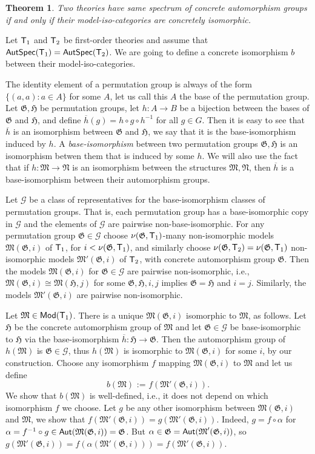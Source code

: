 \documentclass[12pt,leqno]{article}
\newcommand{\de}{\mbox{\ :=\ }}
\newcommand{\Mm}{\mbox{$\mathfrak M$}}
\newcommand{\Nn}{\mbox{$\mathfrak N$}}
\newcommand{\Gg}{\mbox{$\mathfrak G$}}
\newcommand{\Hh}{\mbox{$\mathfrak H$}}
\newcommand{\Aut}{\mbox{\sf Aut}}
\newcommand{\AutSpec}{\mbox{\sf AutSpec}}
\newcommand{\T}{\mbox{\sf T}}
\newcommand{\Mod}{\mbox{\sf Mod}}
\newcommand{\cG}{\mathcal G}
\newtheorem{thm}{Theorem}
\begin{document}
\begin{thm}
	Two theories have same spectrum of concrete automorphism groups if and only if their model-iso-categories are concretely isomorphic.
\end{thm}

Let $\T_1$ and $\T_2$ be first-order theories and assume that $\AutSpec(\T_1)=\AutSpec(\T_2)$.  We are going to define a concrete isomorphism $b$ between their model-iso-categories.

The identity element of a permutation group is always of the form $\{(a,a) : a\in A\}$ for some $A$, let us call this $A$ the base of the permutation group. Let $\Gg,\Hh$ be permutation groups, let $h:A\to B$ be a bijection between the bases of $\Gg$ and $\Hh$, and define $\overline{h}(g) = h\circ g\circ h^{-1}$  for all $g\in G$. Then it is easy to see that $\overline{h}$ is an isomorphism between $\Gg$ and $\Hh$, we say that it is the base-isomorphism induced  by $h$. A \emph{base-isomorphism} between two permutation groups $\Gg,\Hh$ is an isomorphism betwen them that is induced by some $h$. We will also use the fact that if $h:\Mm\to\Nn$ is an isomorphism between the structures $\Mm,\Nn$, then $\overline{h}$ is a base-isomorphism between their automorphism groups.

Let $\cG$ be a class of representatives for the  base-isomorphism classes of permutation groups. That is, each permutation group has a base-isomorphic copy in $\cG$ and the elements of $\cG$ are pairwise non-base-isomorphic.
%
For any permutation group $\Gg\in\cG$ choose $\nu(\Gg,\T_1)$-many non-isomorphic models $\Mm(\Gg,i)$ of $\T_1$, for $i<\nu(\Gg,\T_1)$, and similarly choose $\nu(\Gg,\T_2)=\nu(\Gg,\T_1)$ non-isomorphic models $\Mm'(\Gg,i)$ of $\T_2$, with concrete automorphism group $\Gg$.  Then the models $\Mm(\Gg,i)$ for $\Gg\in\cG$ are pairwise non-isomorphic, i.e., $\Mm(\Gg,i)\cong\Mm(\Hh,j)$ for some $\Gg,\Hh,i,j$ implies $\Gg=\Hh$ and $i=j$. Similarly, the models $\Mm'(\Gg,i)$ are pairwise non-isomorphic.

Let $\Mm\in\Mod(\T_1)$. There is a unique $\Mm(\Gg,i)$ isomorphic to $\Mm$, as follows. Let $\Hh$ be the concrete automorphism group of $\Mm$ and let $\Gg\in\cG$ be base-isomorphic to $\Hh$ via the base-isomorphism $\overline{h}:\Hh\to\Gg$. Then the automorphism group of $h(\Mm)$ is $\Gg\in\cG$, thus $h(\Mm)$ is isomorphic to $\Mm(\Gg,i)$ for some $i$, by our construction.
%
Choose any isomorphism $f$ mapping $\Mm(\Gg,i)$ to $\Mm$ and let us define
\[ b(\Mm) \de f(\Mm'(\Gg,i)) .\]
We show that $b(\Mm)$ is well-defined, i.e., it does not depend on which isomorphism $f$ we choose.  Let $g$ be any other isomorphism between $\Mm(\Gg,i)$ and $\Mm$, we show that $f(\Mm'(\Gg,i))=g(\Mm'(\Gg,i))$. Indeed, $g=f\circ\alpha$ for $\alpha=f^{-1}\circ g\in\Aut(\Mm(\Gg,i))=\Gg$. But $\alpha\in\Gg=\Aut(\Mm'(\Gg,i))$, so $g(\Mm'(\Gg,i))=f(\alpha(\Mm'(\Gg,i)))=f(\Mm'(\Gg,i))$. 
%
\end{document}
